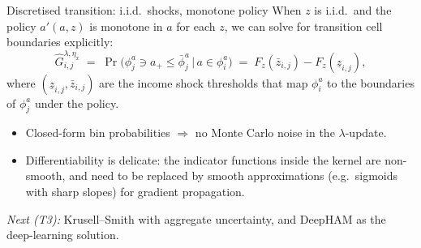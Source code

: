 \begin{frame}{Discretised transition: i.i.d.\ shocks, monotone policy}
When $z$ is i.i.d.\ and the policy $a'(a,z)$ is monotone in $a$ for each $z$, we can solve for transition cell boundaries explicitly:
\[
\hat G^{\lambda,\eta_x}_{i,j}
\;=\; \Pr\!\big(\phi_j^a \ni a_+ \leq \bar\phi_j^a \,\big|\, a \in \phi_i^a\big)
\;=\; F_z(\bar z_{i,j}) - F_z(\underline z_{i,j}),
\]
where $(\underline z_{i,j}, \bar z_{i,j})$ are the income shock thresholds that map $\phi_i^a$ to the boundaries of $\phi_j^a$ under the policy.
\medskip
\begin{itemize}
\item Closed-form bin probabilities $\Rightarrow$ no Monte Carlo noise in the $\lambda$-update.
\item Differentiability is delicate: the indicator functions inside the kernel are non-smooth, and need to be replaced by smooth approximations (e.g.\ sigmoids with sharp slopes) for gradient propagation.
\end{itemize}
\medskip
\emph{Next (T3):} Krusell--Smith with aggregate uncertainty, and DeepHAM as the deep-learning solution.
\end{frame}


